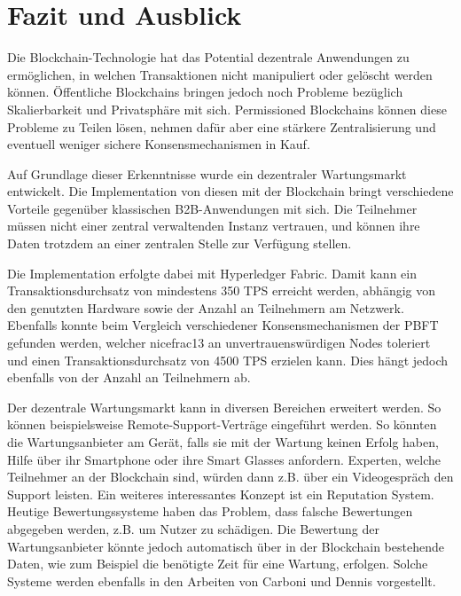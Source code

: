 
\chapter{Fazit und Ausblick}
\label{cha:fazit}

Die Blockchain-Technologie hat das Potential dezentrale Anwendungen zu ermöglichen, in welchen Transaktionen nicht manipuliert oder gelöscht werden können. Öffentliche Blockchains bringen jedoch noch Probleme bezüglich Skalierbarkeit und Privatsphäre mit sich. Permissioned Blockchains können diese Probleme zu Teilen lösen, nehmen dafür aber eine stärkere Zentralisierung und eventuell weniger sichere Konsensmechanismen in Kauf. 

Auf Grundlage dieser Erkenntnisse wurde ein dezentraler Wartungsmarkt entwickelt. Die Implementation von diesen mit der Blockchain bringt verschiedene Vorteile gegenüber klassischen B2B-Anwendungen mit sich. Die Teilnehmer müssen nicht einer zentral verwaltenden Instanz vertrauen, und können ihre Daten trotzdem an einer zentralen Stelle zur Verfügung stellen.

Die Implementation erfolgte dabei mit Hyperledger Fabric. Damit kann ein Transaktionsdurchsatz von mindestens 350 TPS erreicht werden, abhängig von den genutzten Hardware sowie der Anzahl an Teilnehmern am Netzwerk. Ebenfalls konnte beim Vergleich verschiedener Konsensmechanismen der PBFT gefunden werden, welcher nicefrac{1}{3} an unvertrauenswürdigen Nodes toleriert und einen Transaktionsdurchsatz von 4500 TPS erzielen kann. Dies hängt jedoch ebenfalls von der Anzahl an Teilnehmern ab.

Der dezentrale Wartungsmarkt kann in diversen Bereichen erweitert werden. So können beispielsweise Remote-Support-Verträge eingeführt werden. So könnten die Wartungsanbieter am Gerät, falls sie mit der Wartung keinen Erfolg haben, Hilfe über ihr Smartphone oder ihre Smart Glasses anfordern. Experten, welche Teilnehmer an der Blockchain sind, würden dann z.B. über ein Videogespräch den Support leisten. Ein weiteres interessantes Konzept ist ein Reputation System. Heutige Bewertungssysteme haben das Problem, dass falsche Bewertungen abgegeben werden, z.B. um Nutzer zu schädigen. Die Bewertung der Wartungsanbieter könnte jedoch automatisch über in der Blockchain bestehende Daten, wie zum Beispiel die benötigte Zeit für eine Wartung, erfolgen. Solche Systeme werden ebenfalls in den Arbeiten von Carboni \cite{CarboniFeedbackbasedReputation2015} und Dennis \cite{DennisRepblocknext2015} vorgestellt.

